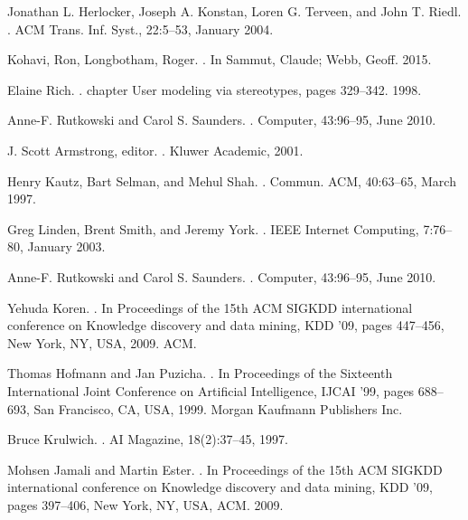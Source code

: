 \begin{thebibliography}{10}
Jonathan L. Herlocker, Joseph A. Konstan, Loren G. Terveen, and John T. Riedl.
.
\newblock ACM Trans. Inf. Syst., 22:5–53, January 2004.

Kohavi, Ron, Longbotham, Roger.
.
\newblock In Sammut, Claude; Webb, Geoff. 2015.

Elaine Rich.
.
\newblock chapter User modeling via stereotypes, pages 329–342. 1998.

Anne-F. Rutkowski and Carol S. Saunders.
.
\newblock Computer, 43:96–95, June 2010.

J. Scott Armstrong, editor.
.
\newblock Kluwer Academic, 2001.

Henry Kautz, Bart Selman, and Mehul Shah.
.
\newblock Commun. ACM, 40:63–65, March 1997.

Greg Linden, Brent Smith, and Jeremy York. 
.
\newblock IEEE Internet Computing, 7:76–80, January 2003.

Anne-F. Rutkowski and Carol S. Saunders.
.
\newblock Computer, 43:96–95, June 2010.

Yehuda Koren.
.
\newblock In Proceedings of the 15th ACM SIGKDD international conference on Knowledge discovery and data mining, KDD ’09, pages 447–456, New York, NY, USA, 2009. ACM.

Thomas Hofmann and Jan Puzicha.
.
\newblock In Proceedings of the Sixteenth International Joint Conference on Artificial Intelligence, IJCAI ’99, pages 688–693, San Francisco, CA, USA, 1999. Morgan Kaufmann Publishers Inc.

Bruce Krulwich.
.
\newblock AI Magazine, 18(2):37–45, 1997.

Mohsen Jamali and Martin Ester.
.
\newblock In Proceedings of the 15th ACM SIGKDD international conference on Knowledge discovery and data mining, KDD ’09, pages 397–406, New York, NY, USA, ACM. 2009.

\end{thebibliography}
